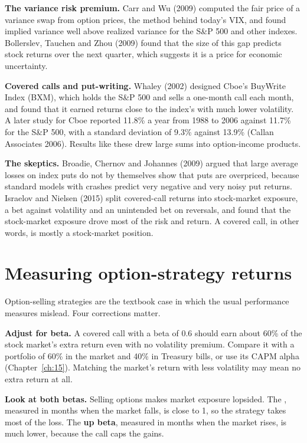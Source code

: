 \textbf{The variance risk premium.} Carr and Wu (2009) computed the fair price of a variance swap from option prices, the method behind today's VIX, and found implied variance well above realized variance for the S\&P 500 and other indexes. Bollerslev, Tauchen and Zhou (2009) found that the size of this gap predicts stock returns over the next quarter, which suggests it is a price for economic uncertainty.

\textbf{Covered calls and put-writing.} Whaley (2002) designed Cboe's BuyWrite Index (BXM), which holds the S\&P 500 and sells a one-month call each month, and found that it earned returns close to the index's with much lower volatility. A later study for Cboe reported 11.8\% a year from 1988 to 2006 against 11.7\% for the S\&P 500, with a standard deviation of 9.3\% against 13.9\% (Callan Associates 2006). Results like these drew large sums into option-income products.

\textbf{The skeptics.} Broadie, Chernov and Johannes (2009) argued that large average losses on index puts do not by themselves show that puts are overpriced, because standard models with crashes predict very negative and very noisy put returns. Israelov and Nielsen (2015) split covered-call returns into stock-market exposure, a bet against volatility and an unintended bet on reversals, and found that the stock-market exposure drove most of the risk and return. A covered call, in other words, is mostly a stock-market position.

\section{Measuring option-strategy returns}
\label{sec:16-measure}

Option-selling strategies are the textbook case in which the usual performance measures mislead. Four corrections matter.

\textbf{Adjust for beta.} A covered call with a beta of 0.6 should earn about 60\% of the stock market's extra return even with no volatility premium. Compare it with a portfolio of 60\% in the market and 40\% in Treasury bills, or use its CAPM alpha (Chapter~\ref{ch:15}). Matching the market's return with less volatility may mean no extra return at all.

\textbf{Look at both betas.} Selling options makes market exposure lopsided. The , measured in months when the market falls, is close to 1, so the strategy takes most of the loss. The \textbf{up beta}, measured in months when the market rises, is much lower, because the call caps the gains.

